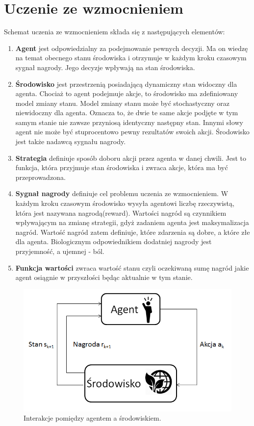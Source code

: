 \documentclass[12pt]{book}
\begin{document}
\section{Uczenie ze wzmocnieniem}
Schemat uczenia ze wzmocnieniem składa się z następujących elementów:
\begin{enumerate}
\item \textbf{Agent} jest odpowiedzialny za podejmowanie pewnych decyzji. Ma on wiedzę na temat obecnego stanu środowiska i otrzymuje w każdym kroku czasowym sygnał nagrody. Jego decyzje wpływają na stan środowiska.
\item \textbf{Środowisko} jest przestrzenią posiadającą dynamiczny stan widoczny dla agenta. Chociaż to agent podejmuje akcje, to środowisko ma zdefiniowany model zmiany stanu. Model zmiany stanu może być stochastyczny oraz niewidoczny dla agenta. Oznacza to, że dwie te same akcje podjęte w tym samym stanie nie zawsze przyniosą identyczny następny stan. Innymi słowy agent nie może być stuprocentowo pewny rezultatów swoich akcji. Środowisko jest także nadawcą sygnału nagrody.
\item \textbf{Strategia} definiuje sposób doboru akcji przez agenta w danej chwili. Jest to funkcja, która przyjmuje stan środowiska i zwraca akcje, która ma być przeprowadzona. 
\item \textbf{Sygnał nagrody} definiuje cel problemu uczenia ze wzmocnieniem. W każdym kroku czasowym środowisko wysyła agentowi liczbę rzeczywistą, która jest nazywana nagrodą(reward). Wartości nagród są czynnikiem wpływającym na zmianę strategii, gdyż zadaniem agenta jest maksymalizacja nagród. Wartość nagród zatem definiuje, które zdarzenia są dobre, a które złe dla agenta. Biologicznym odpowiednikiem dodatniej nagrody jest przyjemność, a ujemnej - ból. 
\item \textbf{Funkcja wartości} zwraca wartość stanu czyli oczekiwaną sumę nagród jakie agent osiągnie w przyszłości będąc aktualnie w tym stanie. 
\end{enumerate}
\begin{figure}[H]
  \centering
    \includegraphics[width=14cm]{agent-srodowisko}
 \caption{Interakcje pomiędzy agentem a środowiskiem.}
 \label{fig:agent-srodowisko}
\end{figure}
\end{document}
